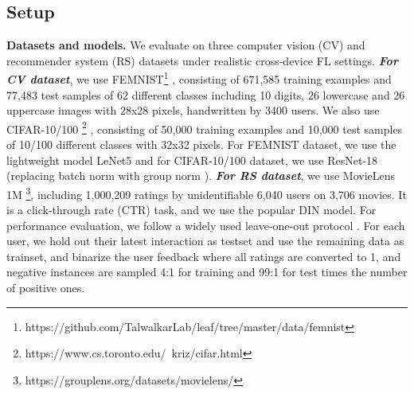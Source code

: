\begin{table}[t]
    \centering
    \caption{\small\textbf{Results on MovieLens-1M.} The best method is highlighted in \textbf{bold} fonts.}
    \label{tab:ml-1m}
\end{table}

\subsection{Setup}
\textbf{Datasets and models.} We evaluate \fedeve on three computer vision (CV) and recommender system (RS) datasets under realistic cross-device FL settings. \emph{\textbf{For CV dataset}}, we use FEMNIST\footnote{https://github.com/TalwalkarLab/leaf/tree/master/data/femnist} \cite{caldas2018leaf}, consisting of 671,585 training examples and 77,483 test samples of 62 different classes including 10 digits, 26 lowercase and 26 uppercase images with 28x28 pixels, handwritten by 3400 users. 
We also use CIFAR-10/100 \footnote{https://www.cs.toronto.edu/~kriz/cifar.html} \cite{caldas2018leaf}, consisting of 50,000 training examples and 10,000 test samples of 10/100 different classes with 32x32 pixels. For FEMNIST dataset, we use the lightweight model LeNet5 \cite{lecun1998gradient} and for CIFAR-10/100 dataset, we use ResNet-18 (replacing batch norm with group norm \citep{hsieh2020non,reddi2020adaptive}).
\emph{\textbf{For RS dataset}}, we use MovieLens 1M \footnote{https://grouplens.org/datasets/movielens/}\cite{harper2015movielens}, including 1,000,209 ratings by unidentifiable 6,040 users on 3,706 movies. It is a click-through rate (CTR) task, and we use the popular DIN \cite{zhou2018deep} model. For performance evaluation, we follow a widely used leave-one-out protocol \cite{muhammad2020fedfast}. For each user, we hold out their latest interaction as testset and use the remaining data as trainset, and binarize the user feedback where all ratings are converted to 1, and negative instances are sampled 4:1 for training and 99:1 for test times the number of positive ones.



